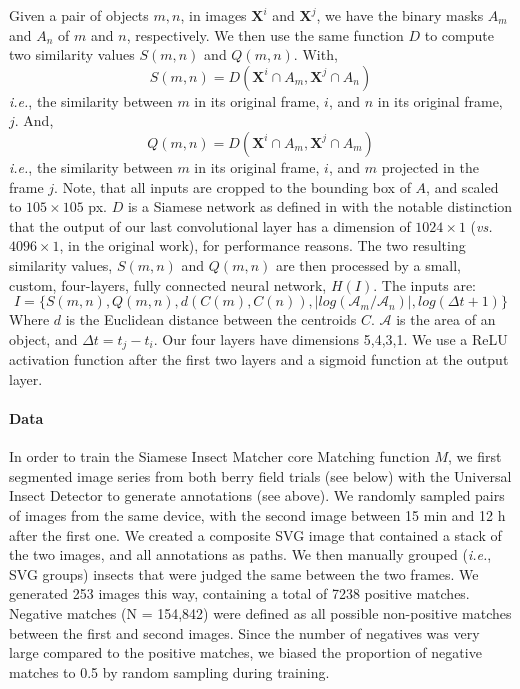 \documentclass[fleqn,10pt]{wlscirep}
\begin{document}
Given a pair of objects $m, n$, in images $\mathbf{X}^i$ and $\mathbf{X}^j$, we have the binary masks $A_m$ and $A_n$ of $m$ and $n$, respectively.
We then use the same function $D$ to compute two similarity values $S(m,n)$ and $Q(m,n)$. 
With,
$$
S(m,n) = D(\mathbf{X}^i \cap A_m , \mathbf{X}^j \cap A_n )
$$
\emph{i.e.}, the similarity between $m$ in its original frame, $i$, and $n$ in its original frame, $j$. And,
$$
Q(m,n) = D(\mathbf{X}^i \cap  A_m , \mathbf{X}^j \cap A_m )
$$
\emph{i.e.}, the similarity between $m$ in its original frame, $i$, and $m$ projected in the frame $j$. Note, that all inputs are cropped to the bounding box of $A$, and scaled to $105 \times{} 105$ px. $D$ is a Siamese network as defined in\cite{koch_siamese_2015} with the notable distinction that the output of our last convolutional layer has a dimension of $1024 \times{} 1$ (\emph{vs.} $4096 \times{} 1$, in the original work), for performance reasons. The two resulting similarity values, $S(m,n)$ and $Q(m,n)$ are then processed by a small, custom, four-layers, fully connected neural network, $H(I)$. The inputs are: 
$$
I=\{ S(m,n), Q(m,n), d(C(m), C(n)), |log(\mathcal{A}_m/\mathcal{A}_n)|, log(\Delta t + 1)\}
$$ Where $d$ is the Euclidean distance between the centroids $C$. $\mathcal{A}$ is the area of an object, and $\Delta t = t_j- t_i$. Our four layers have dimensions {5,4,3,1}. We use a ReLU activation function after the first two layers and a sigmoid function at the output layer.

\paragraph{Data}
In order to train the Siamese Insect Matcher core Matching function $M$, we first segmented image series from both berry field trials (see below) with the Universal Insect Detector to generate annotations (see above). We randomly sampled pairs of images from the same device, with the second image between 15 min and 12 h after the first one. We created a composite SVG image that contained a stack of the two images, and all annotations as paths. We then manually grouped (\emph{i.e.}, SVG groups) insects that were judged the same between the two frames. We generated 253 images this way, containing a total of 7238 positive matches. Negative matches (N = 154,842) were defined as all possible non-positive matches between the first and second images. Since the number of negatives was very large compared to the positive matches, we biased the proportion of negative matches to 0.5 by random sampling during training.
\end{document}
